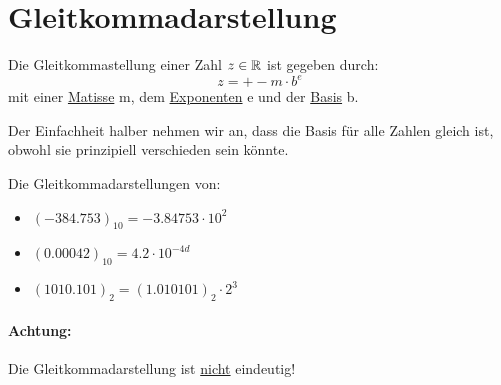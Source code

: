 \section{Gleitkommadarstellung}
\begin{definition}[Gleitkommadarstellung]
	Die Gleitkommastellung einer Zahl $z \in  \mathbb{R}$ ist gegeben durch:
	\[
	z=+-m\cdot b^{e}
	\]
mit einer \underline{Matisse} m, dem \underline{Exponenten} e und der \underline{Basis} b.
\end{definition}
Der Einfachheit halber nehmen wir an, dass die Basis für alle Zahlen gleich ist, obwohl sie prinzipiell verschieden sein könnte.
\begin{example}
Die Gleitkommadarstellungen von:
\begin{itemize}
	\item $(-384.753)_{10}= -3.84753 \cdot 10^2$
	\item $(0.00042)_{10}=4.2 \cdot 10^{-4d}$
	\item $(1010.101)_2= (1.010101)_2 \cdot 2^{3}$
\end{itemize}
\end{example}
\paragraph{Achtung:} Die Gleitkommadarstellung ist \underline{nicht} eindeutig!

